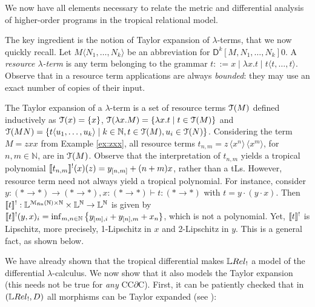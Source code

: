 

We now have all elements necessary to relate the metric and differential analysis of higher-order programs in the tropical relational model. 

The key ingredient is the notion of Taylor expansion of $\lambda$-terms, that we now quickly recall. 
Let $M\langle N_{1},\dots, N_{k}\rangle$ be an abbreviation for
$\mathsf D^{k}[M, N_{1},\dots, N_{k}]0$. A \emph{resource $\lambda$-term} is any term belonging to the grammar $t::= x \mid \lambda x.t \mid t \langle t,\dots, t\rangle$.
Observe that in a resource term applications are always \emph{bounded}: they may use an exact number of copies of their input. 


The Taylor expansion of a $\lambda$-term is a set of resource terms $\mathcal{T}(M)$ defined inductively as $\mathcal{T}(x)=\{x\}$, $\mathcal{T}(\lambda x.M)=\{\lambda x.t\mid t\in \mathcal{T}(M)\}$ and 
$\mathcal{T}(MN)=\{ t \langle u_{1},\dots, u_{k}\rangle \mid k\in \mathbb N, t\in \mathcal{T}(M), u_{i}\in \mathcal{T}(N) \}$. 
Considering the term $M=zxx$ from Example \ref{ex:zxx}, all resource terms
 $t_{n,m}=z \,\langle x^{n}\rangle\,\langle x^{m}\rangle$, for $n,m\in \mathbb N$, are in $\mathcal{T}(M)$. 
Observe that the interpretation of $t_{n,m}$ yields a tropical polynomial
$\llbracket t_{n,m}\rrbracket^{!}(x)(z)= y_{[n,m]}+(n+m)x$, rather than a tLs. 
However, resource term need not always yield a tropical polynomial. For instance, consider $y:(*\to*)\to (*\to*), x:(*\to *) \vdash t:  (*\to  *)$
with $t=y\cdot (y\cdot x)$. Then 
$\llbracket t\rrbracket^{!}: \mathbb{L}^{  \mathcal M_{\mathrm{fin}}(\mathbb N)\times \mathbb N}
\times \mathbb{L}^{\mathbb N} \to \mathbb{L}^{\mathbb N}$ is given by
$
\llbracket t\rrbracket^{!}(y,x)_{i}= \inf_{m,n\in \mathbb N}\big\{    y_{[m],i}  +  y_{[n],m}+  x_{n}\}
$, 
which is not a polynomial. Yet, $\llbracket t\rrbracket^{!}$ is Lipschitz, more precisely, 1-Lipschitz in $x$ and 2-Lipschitz in $y$. This is a general fact, as shown below.

%
We have already shown that the tropical differential makes $\LREL_{!}$ a model of the differential $\lambda$-calculus. We now show that it also models the Taylor expansion (this needs not be true for \emph{any} CC$\partial$C).
First, it can be patiently checked that in $(\LREL_!,D)$ all morphisms can be Taylor expanded  (see \cite[Definition 4.22]{Manzo2012}):

